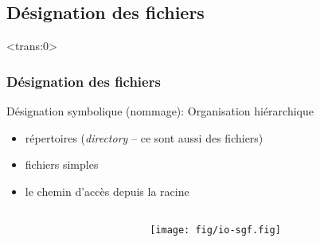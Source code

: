 \subsection{Désignation des fichiers}
\begin{frame}<trans:0>\frametitle{Désignation des fichiers}


  \begin{block}{Désignation symbolique (nommage): \alert{Organisation
        hiérarchique}}
    
    \begin{itemize}
    \item {} répertoires
      (\textit{directory} -- ce sont aussi des fichiers)
    \item {} fichiers simples
    \item {} le chemin d'accès depuis la
      racine

    \end{itemize}
  \end{block}

  \begin{columns}
    \begin{column}{.45\textwidth}
    \end{column}

    \begin{column}{.45\textwidth}
      \texttt{[image: fig/io-sgf.fig]}
    \end{column}
  \end{columns}
\end{frame}


